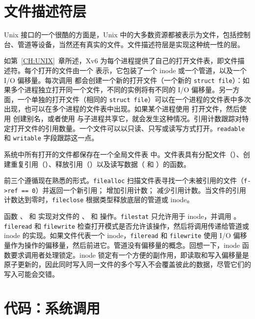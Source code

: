 \section{文件描述符层}

Unix 接口的一个很酷的方面是，Unix 中的大多数资源都被表示为文件，包括控制台、管道等设备，当然还有真实的文件。文件描述符层是实现这种统一性的层。

如第~\ref{CH:UNIX}~章所述，Xv6 为每个进程提供了自己的打开文件表，即文件描述符。每个打开的文件由一个  表示，它包装了一个 inode 或一个管道，以及一个 I/O 偏移量。每次调用  都会创建一个新的打开文件（一个新的 \lstinline{struct file}）：如果多个进程独立打开同一个文件，不同的实例将有不同的 I/O 偏移量。另一方面，一个单独的打开文件（相同的 \lstinline{struct file}）可以在一个进程的文件表中多次出现，也可以在多个进程的文件表中出现。如果某个进程使用  打开文件，然后使用  创建别名，或者使用  与子进程共享它，就会发生这种情况。引用计数跟踪对特定打开文件的引用数量。一个文件可以以只读、只写或读写方式打开。\lstinline{readable} 和 \lstinline{writable} 字段跟踪这一点。

系统中所有打开的文件都保存在一个全局文件表  中。文件表具有分配文件（）、创建重复引用（）、释放引用（）以及读写数据（ 和 ）的函数。

前三个遵循现在熟悉的形式。\lstinline{filealloc} 扫描文件表寻找一个未被引用的文件（\lstinline{f->ref == 0}）并返回一个新引用； 增加引用计数； 减少引用计数。当文件的引用计数达到零时，\lstinline{fileclose} 根据类型释放底层的管道或 inode。

函数 、 和  实现对文件的 、 和  操作。\lstinline{filestat} 只允许用于 inode，并调用 。\lstinline{fileread} 和 \lstinline{filewrite} 检查打开模式是否允许该操作，然后将调用传递给管道或 inode 的实现。如果文件代表一个 inode，\lstinline{fileread} 和 \lstinline{filewrite} 使用 I/O 偏移量作为操作的偏移量，然后前进它。管道没有偏移量的概念。回想一下，inode 函数要求调用者处理锁定。inode 锁定有一个方便的副作用，即读取和写入偏移量是原子更新的，因此同时写入同一文件的多个写入不会覆盖彼此的数据，尽管它们的写入可能会交错。
\section{代码：系统调用}

